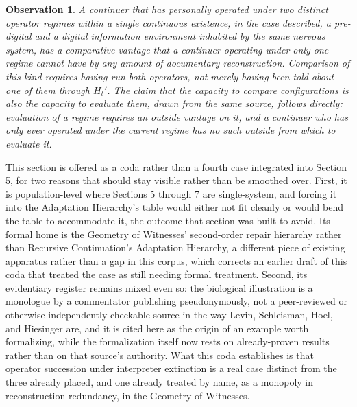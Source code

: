 \documentclass[11pt]{article}
\newtheorem{observation}{Observation}[section]
\begin{document}
\begin{observation}
A continuer that has personally operated under two distinct operator regimes within a single continuous existence, in the case described, a pre-digital and a digital information environment inhabited by the same nervous system, has a comparative vantage that a continuer operating under only one regime cannot have by any amount of documentary reconstruction. Comparison of this kind requires having run both operators, not merely having been told about one of them through $H_t'$. The claim that the capacity to compare configurations is also the capacity to evaluate them, drawn from the same source, follows directly: evaluation of a regime requires an outside vantage on it, and a continuer who has only ever operated under the current regime has no such outside from which to evaluate it.
\end{observation}

This section is offered as a coda rather than a fourth case integrated into Section 5, for two reasons that should stay visible rather than be smoothed over. First, it is population-level where Sections 5 through 7 are single-system, and forcing it into the Adaptation Hierarchy's table would either not fit cleanly or would bend the table to accommodate it, the outcome that section was built to avoid. Its formal home is the Geometry of Witnesses' second-order repair hierarchy rather than Recursive Continuation's Adaptation Hierarchy, a different piece of existing apparatus rather than a gap in this corpus, which corrects an earlier draft of this coda that treated the case as still needing formal treatment. Second, its evidentiary register remains mixed even so: the biological illustration is a monologue by a commentator publishing pseudonymously, not a peer-reviewed or otherwise independently checkable source in the way Levin, Schleisman, Hoel, and Hiesinger are, and it is cited here as the origin of an example worth formalizing, while the formalization itself now rests on already-proven results rather than on that source's authority. What this coda establishes is that operator succession under interpreter extinction is a real case distinct from the three already placed, and one already treated by name, as a monopoly in reconstruction redundancy, in the Geometry of Witnesses.
\end{document}
